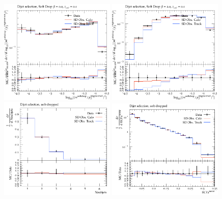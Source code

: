 \begin{figure}
\begin{center}
\includegraphics[width=0.49\textwidth]{figs/RivetPlotsTrackCalo/SoftDropMass/d01-x01-y01.pdf} \hfill
\includegraphics[width=0.49\textwidth]{figs/RivetPlotsTrackCalo/SoftDropMass/d03-x01-y01.pdf} \hfill
\includegraphics[width=0.49\textwidth]{figs/RivetPlotsTrackCalo/ATLAS_2019_I1724098/d23-x01-y01.pdf} \hfill
\includegraphics[width=0.49\textwidth]{figs/RivetPlotsTrackCalo/ATLAS_2019_I1724098/d27-x01-y01.pdf} \hfill
\end{center}
\label{trackCaloTune}
\end{figure}


